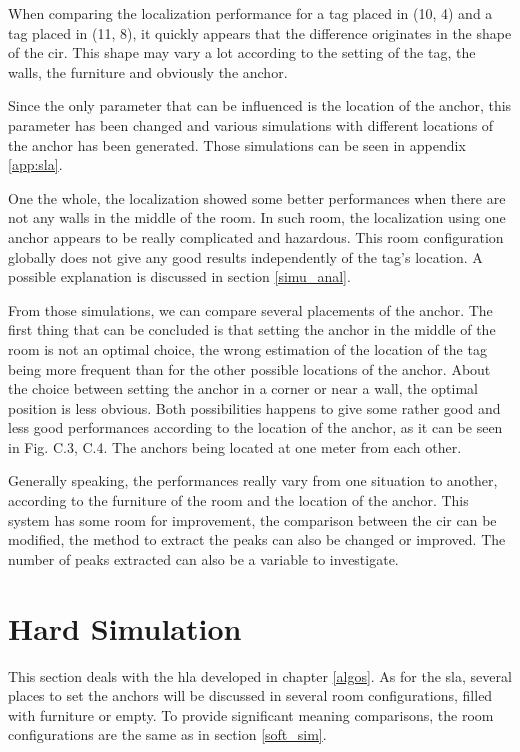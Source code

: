 When comparing the localization performance for a tag placed in (10, 4) and a tag placed in (11, 8), it quickly appears that the difference originates in the shape of the \gls{cir}. This shape may vary a lot according to the setting of the tag,  the walls, the furniture and obviously the anchor. 
\vspace{2mm}

Since the only parameter that can be influenced is the location of the anchor, this parameter has been changed and various simulations with different locations of the anchor has been generated. Those simulations can be seen in appendix \ref{app:sla}.
\vspace{2mm}

One the whole, the localization showed some better performances when there are not any walls in the middle of the room. In such room, the localization using one anchor appears to be really complicated and hazardous. This room configuration globally does not give any good results independently of the tag's location. A possible explanation is discussed in section \ref{simu_anal}.
\vspace{2mm}

From those simulations, we can compare several placements of the anchor. The first thing that can be concluded is that setting the anchor in the middle of the room is not an optimal choice, the wrong estimation of the location of the tag being more frequent than for the other possible locations of the anchor. About the choice between setting the anchor in a corner or near a wall, the optimal position is less obvious. Both possibilities happens to give some rather good and less good performances according to the location of the anchor, as it can be seen in Fig. C.3, C.4. The anchors being located at one meter from each other.
\vspace{2mm}

Generally speaking, the performances really vary from one situation to another, according  to the furniture of the room and the location of the anchor. This system has some room for improvement, the comparison between the \gls{cir} can be modified, the method to extract the peaks can also be changed or improved. The number of peaks extracted can also be a variable to investigate.


\section{Hard Simulation}

This section deals with the \gls{hla} developed in chapter \ref{algos}. As for the \gls{sla}, several places to set the anchors will be discussed in several room configurations, filled with furniture or empty. To provide significant meaning comparisons, the room configurations are the same as in section \ref{soft_sim}.

